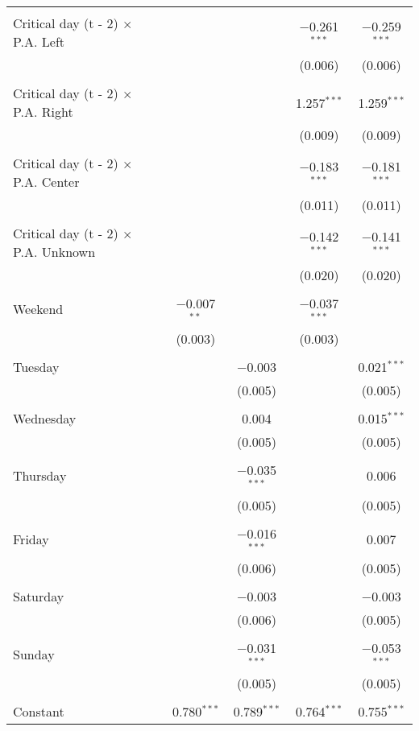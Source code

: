 \documentclass[
]{article}
\begin{document}
\begin{table}[!htbp]
{\begin{tabular}{@{\extracolsep{5pt}}lcccc}
  & & & & \\ 
 Critical day (t - 2) $\times$ P.A. Left &  &  & $-$0.261$^{***}$ & $-$0.259$^{***}$ \\ 
  &  &  & (0.006) & (0.006) \\ 
  & & & & \\ 
 Critical day (t - 2) $\times$ P.A. Right &  &  & 1.257$^{***}$ & 1.259$^{***}$ \\ 
  &  &  & (0.009) & (0.009) \\ 
  & & & & \\ 
 Critical day (t - 2) $\times$ P.A. Center &  &  & $-$0.183$^{***}$ & $-$0.181$^{***}$ \\ 
  &  &  & (0.011) & (0.011) \\ 
  & & & & \\ 
 Critical day (t - 2) $\times$ P.A. Unknown &  &  & $-$0.142$^{***}$ & $-$0.141$^{***}$ \\ 
  &  &  & (0.020) & (0.020) \\ 
  & & & & \\ 
 Weekend & $-$0.007$^{**}$ &  & $-$0.037$^{***}$ &  \\ 
  & (0.003) &  & (0.003) &  \\ 
  & & & & \\ 
 Tuesday &  & $-$0.003 &  & 0.021$^{***}$ \\ 
  &  & (0.005) &  & (0.005) \\ 
  & & & & \\ 
 Wednesday &  & 0.004 &  & 0.015$^{***}$ \\ 
  &  & (0.005) &  & (0.005) \\ 
  & & & & \\ 
 Thursday &  & $-$0.035$^{***}$ &  & 0.006 \\ 
  &  & (0.005) &  & (0.005) \\ 
  & & & & \\ 
 Friday &  & $-$0.016$^{***}$ &  & 0.007 \\ 
  &  & (0.006) &  & (0.005) \\ 
  & & & & \\ 
 Saturday &  & $-$0.003 &  & $-$0.003 \\ 
  &  & (0.006) &  & (0.005) \\ 
  & & & & \\ 
 Sunday &  & $-$0.031$^{***}$ &  & $-$0.053$^{***}$ \\ 
  &  & (0.005) &  & (0.005) \\ 
  & & & & \\ 
 Constant & 0.780$^{***}$ & 0.789$^{***}$ & 0.764$^{***}$ & 0.755$^{***}$ \\ 

\end{tabular}}
\end{table}
\end{document}
